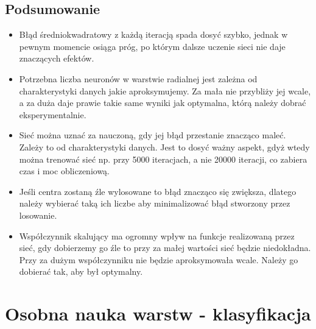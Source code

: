 \documentclass[a4paper, portrait,11pt]{article}
\begin{document}
\subsection{Podsumowanie}
\begin{itemize}
  \item Błąd średniokwadratowy z każdą iteracją spada dosyć szybko, jednak w pewnym momencie osiąga próg, po którym dalsze uczenie sieci nie daje znaczących efektów.
  \item Potrzebna liczba neuronów w warstwie radialnej jest zależna od charakterystyki danych jakie aproksymujemy. Za mała nie przybliży jej wcale, a za duża daje prawie takie same wyniki jak optymalna, którą należy dobrać eksperymentalnie.
  \item Sieć można uznać za nauczoną, gdy jej błąd przestanie znacząco maleć. Zależy to od charakterystyki danych. Jest to dosyć ważny aspekt, gdyż wtedy można trenować sieć np. przy 5000 iteracjach, a nie 20000 iteracji, co zabiera czas i moc obliczeniową.
  \item Jeśli centra zostaną źle wylosowane to błąd znacząco się zwiększa, dlatego należy wybierać taką ich liczbe aby minimalizować błąd stworzony przez losowanie.
  \item Współczynnik skalujący ma ogromny wpływ na funkcje realizowaną przez sieć, gdy dobierzemy go źle to przy za małej wartości sieć będzie niedokładna. Przy za dużym współczynniku nie będzie aproksymowała wcale. Należy go dobierać tak, aby był optymalny.
\end{itemize}

\section{Osobna nauka warstw - klasyfikacja}
\end{document}
